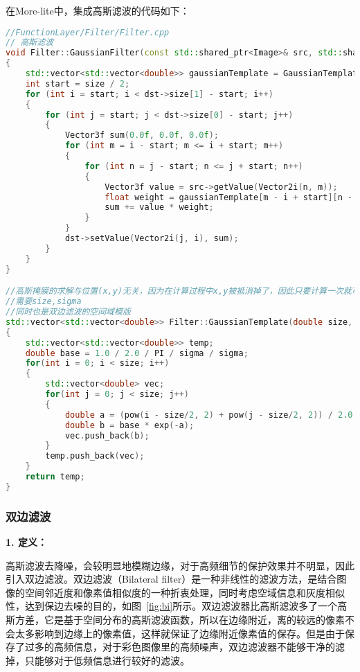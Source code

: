 \documentclass[lang=cn,10pt]{elegantbook}
\begin{document}
在More-lite中，集成高斯滤波的代码如下：
\begin{lstlisting}[language=c++]
//FunctionLayer/Filter/Filter.cpp
// 高斯滤波
void Filter::GaussianFilter(const std::shared_ptr<Image>& src, std::shared_ptr<Image>& dst,double size, double sigma)
{
    std::vector<std::vector<double>> gaussianTemplate = GaussianTemplate(size,sigma);
    int start = size / 2;
    for (int i = start; i < dst->size[1] - start; i++)
    {
        for (int j = start; j < dst->size[0] - start; j++)
        {
            Vector3f sum(0.0f, 0.0f, 0.0f);
            for (int m = i - start; m <= i + start; m++)
            {
                for (int n = j - start; n <= j + start; n++)
                {
                    Vector3f value = src->getValue(Vector2i(n, m));
                    float weight = gaussianTemplate[m - i + start][n - j + start];
                    sum += value * weight;
                }
            }
            dst->setValue(Vector2i(j, i), sum);
        }
    } 
}

//高斯掩膜的求解与位置(x,y)无关，因为在计算过程中x,y被抵消掉了，因此只要计算一次就可以了
//需要size,sigma
//同时也是双边滤波的空间域模版
std::vector<std::vector<double>> Filter::GaussianTemplate(double size, double sigma)
{
    std::vector<std::vector<double>> temp;
    double base = 1.0 / 2.0 / PI / sigma / sigma;
    for(int i = 0; i < size; i++)
    {
        std::vector<double> vec;
        for(int j = 0; j < size; j++)
        {
            double a = (pow(i - size/2, 2) + pow(j - size/2, 2)) / 2.0 / sigma / sigma;
            double b = base * exp(-a);
            vec.push_back(b);
        }
        temp.push_back(vec);
    }
    return temp;
}
\end{lstlisting}


\subsubsection{双边滤波}
\textcolor{third}{\textbf{1. 定义：}}

高斯滤波去降噪，会较明显地模糊边缘，对于高频细节的保护效果并不明显，因此引入双边滤波。双边滤波（Bilateral filter）是一种非线性的滤波方法，是结合图像的空间邻近度和像素值相似度的一种折衷处理，同时考虑空域信息和灰度相似性，达到保边去噪的目的，如图~\ref{fig:bi}所示。双边滤波器比高斯滤波多了一个高斯方差，它是基于空间分布的高斯滤波函数，所以在边缘附近，离的较远的像素不会太多影响到边缘上的像素值，这样就保证了边缘附近像素值的保存。但是由于保存了过多的高频信息，对于彩色图像里的高频噪声，双边滤波器不能够干净的滤掉，只能够对于低频信息进行较好的滤波。
\end{document}
